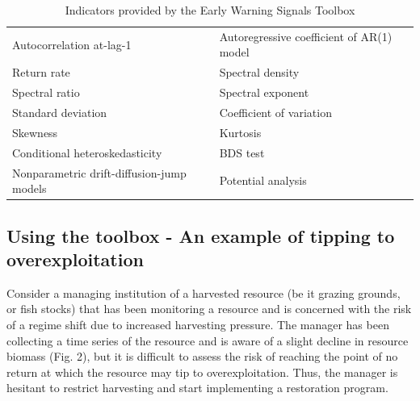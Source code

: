 \documentclass[12pt,a4paper,final]{article}
\begin{document}
\begin{doublespacing}
\begin{table}[h]
\centering
\caption{Indicators provided by the Early Warning Signals Toolbox}%
\begin{tabular}{l l}%
\hline
\hline
Autocorrelation at-lag-1 &	%
Autoregressive coefficient of AR(1) model	\\ %
Return rate &	%
Spectral density \\%
Spectral ratio &	%
Spectral exponent\\	%
Standard deviation &	%
Coefficient of variation\\	%
Skewness &	%
Kurtosis	\\%
Conditional heteroskedasticity	&%
BDS test	\\%
Nonparametric drift-diffusion-jump models	&%
Potential analysis	\\ [0.5ex]%
\hline
\hline
\end{tabular}
\label{methods_table}
\end{table}%

\subsection{Using the toolbox - An example of tipping to overexploitation}
Consider a managing institution of a harvested resource (be it grazing grounds, or fish stocks) that has been monitoring a resource and is concerned with the risk of a regime shift due to increased harvesting pressure. The manager has been collecting a time series of the resource and is aware of a slight decline in resource biomass (Fig. 2), but it is difficult to assess the risk of reaching the point of no return at which the resource may tip to overexploitation. Thus, the manager is hesitant to restrict harvesting and start implementing a restoration program. 


\end{doublespacing}
\end{document}
